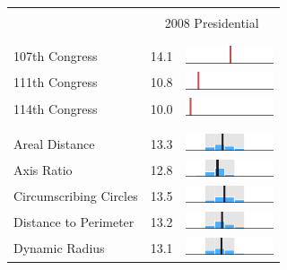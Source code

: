 
\begin{table}
\renewcommand{\arraystretch}{0.7}
 \begin{tabular}{l rm{7em}}
\hline \hline \\

{} & \multicolumn{2}{c}{2008 Presidential} \\

\\ \hline \\
107th Congress         &  14.1 &          \includegraphics[width=7em]{mini_hist/FL_2008_107} \\
111th Congress         &  10.8 &          \includegraphics[width=7em]{mini_hist/FL_2008_111} \\
114th Congress         &  10.0 &          \includegraphics[width=7em]{mini_hist/FL_2008_114} \\
\\ \hline \\ 
Areal Distance         &  13.3 &       \includegraphics[width=7em]{mini_hist/FL_2008_dist_a} \\
Axis Ratio             &  12.8 &   \includegraphics[width=7em]{mini_hist/FL_2008_axis_ratio} \\
Circumscribing Circles &  13.5 &        \includegraphics[width=7em]{mini_hist/FL_2008_reock} \\
Distance to Perimeter  &  13.2 &     \includegraphics[width=7em]{mini_hist/FL_2008_rohrbach} \\
Dynamic Radius         &  13.1 &   \includegraphics[width=7em]{mini_hist/FL_2008_dyn_radius} \\

\end{tabular}
\end{table}
